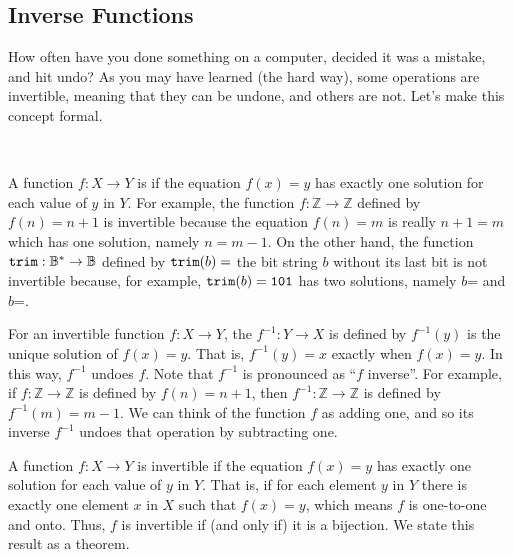 \newcommand{\subinverses}{Inverse Functions}
\subsection{\subinverses}
\label{sub_inverses}

How often have you done something on a computer, decided it was a mistake, and hit undo?  As you may have learned (the hard way), some operations are invertible, meaning that they can be undone, and others are not. Let's make this concept formal.

\begin{defn}
\label{defn_inverse_fn}
~
    \begin{apart}
        \item A function $f: X \to Y$ is  if the equation $f(x) = y$ has exactly one solution for each value of $y$ in $Y$. For example, the function $f: \mathbb{Z} \to \mathbb{Z}$ defined by $f(n) = n+1$ is invertible because the equation $f(n) = m$ is  really $n+1=m$ which has one solution, namely $n=m-1$.  On the other hand, the function $\texttt{trim}: \mathbb{B}^* \to \mathbb{B}$ defined by $\texttt{trim}(b) =$ the bit string $b$ without its last bit is not invertible because, for example, $\texttt{trim}(b) = \texttt{101}$ has two solutions, namely $b$= and $b$=.
        
        \item For an invertible function $f: X \to Y$, the  $f^{-1}: Y \to X$ is defined by $f^{-1}(y)$ is the unique solution of $f(x)=y$. That is, $f^{-1}(y)=x$ exactly when $f(x) = y$.  In this way, $f^{-1}$ undoes $f$.  Note that $f^{-1}$ is pronounced as ``$f$ inverse''.  For example, if $f: \mathbb{Z} \to \mathbb{Z}$ is defined by $f(n) = n+1$, then $f^{-1}: \mathbb{Z} \to \mathbb{Z}$ is defined by $f^{-1}(m) = m-1$.  We can think of the function $f$ as adding one, and so its inverse $f^{-1}$ undoes that operation by subtracting one.
    \end{apart}
\end{defn}

A function $f: X \to Y$ is invertible if the equation $f(x) = y$ has exactly one solution for each value of $y$ in $Y$.  That is, if for each element $y$ in $Y$ there is exactly one element $x$ in $X$ such that $f(x) = y$, which means $f$ is one-to-one and onto.  Thus, $f$ is invertible if (and only if) it is a bijection.  We state this result as a theorem.

